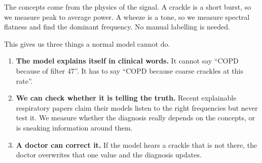 \documentclass[11pt,a4paper]{article}
\begin{document}
\vspace{4pt}
\begin{center}
\end{center}

\vspace{4pt}
The concepts come from the physics of the signal. A crackle is a short burst, so we
measure peak to average power. A wheeze is a tone, so we measure spectral flatness and
find the dominant frequency. No manual labelling is needed.

This gives us three things a normal model cannot do.

\begin{enumerate}\setlength{\itemsep}{2pt}
\item \textbf{The model explains itself in clinical words.} It cannot say ``COPD because
      of filter 47''. It has to say ``COPD because coarse crackles at this rate''.
\item \textbf{We can check whether it is telling the truth.} Recent explainable
      respiratory papers claim their models listen to the right frequencies but never
      test it. We measure whether the diagnosis really depends on the concepts, or is
      sneaking information around them.
\item \textbf{A doctor can correct it.} If the model hears a crackle that is not there,
      the doctor overwrites that one value and the diagnosis updates.
\end{enumerate}
\end{document}
